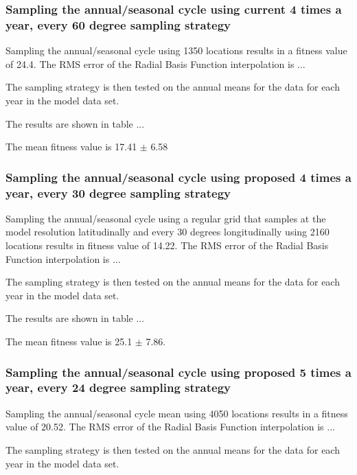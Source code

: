 \documentclass[11pt, a4paper]{article}
\numberwithin{figure}{section}
\numberwithin{table}{section}
\begin{document}
\subsubsection{Sampling the annual/seasonal cycle using current 4 times a year, every 60 degree sampling strategy}
Sampling the annual/seasonal cycle using 1350 locations results in a fitness
value of 24.4.
The RMS error of the Radial Basis Function interpolation is ...

The sampling strategy is then tested on the annual means for the data
for each year in the model data set.

The results are shown in table ...

The mean fitness value is 17.41 $\pm$ 6.58



\subsubsection{Sampling the annual/seasonal cycle using proposed 4 times a year, every 30 degree sampling strategy}
Sampling the annual/seasonal cycle using a regular grid that samples at the model 
resolution latitudinally and every 30 degrees longitudinally using 2160 locations results in fitness
value of 14.22.
The RMS error of the Radial Basis Function interpolation is ...

The sampling strategy is then tested on the annual means for the data
for each year in the model data set.

The results are shown in table ...

The mean fitness value is 25.1 $\pm$ 7.86.



\subsubsection{Sampling the annual/seasonal cycle using proposed 5 times a year, every 24 degree sampling strategy}
Sampling the annual/seasonal cycle mean using 4050 locations results in a fitness
value of 20.52.
The RMS error of the Radial Basis Function interpolation is ...

The sampling strategy is then tested on the annual means for the data
for each year in the model data set.
\end{document}
